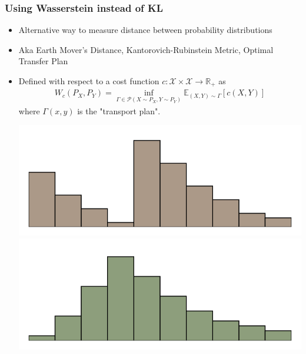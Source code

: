 \documentclass{beamer}
\newcommand{\E}{\mathbb{E}}
\newcommand{\R}{\mathbb{R}}
\begin{document}
\begin{frame}
\frametitle{Using Wasserstein instead of KL}
\begin{itemize}
\setlength\itemsep{1em}
\item Alternative way to measure distance between probability distributions
\pause

\item Aka Earth Mover's Distance, Kantorovich-Rubinstein Metric, Optimal Transfer Plan
\pause

\item Defined with respect to a cost function $c : \mathcal{X} \times \mathcal{X} \to \R_{+}$ as 
\begin{align*}
W_c(P_X, P_Y) = \inf_{\Gamma \in \mathcal{P}(X \sim P_X, Y \sim P_Y)} \E_{(X, Y) \sim \Gamma} [c(X, Y)]
\end{align*}
where $\Gamma(x, y)$ is the "transport plan".

\begin{center}
\includegraphics[scale=0.4]{discrete-em1}
\includegraphics[scale=0.4]{discrete-em2}
\end{center}
\end{itemize}
\end{frame}
\end{document}
